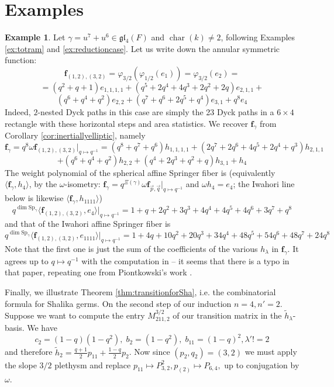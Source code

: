 \documentclass{amsart}
\numberwithin{equation}{section}
\theoremstyle{definition}
\newtheorem{example}[lemma]{Example}%
\def\tilde{\widetilde}
\def\Sp{{\mathrm{Sp}}}
\renewcommand{\th}{\tilde{h}}
\newcommand{\frs}{\mathbf{f}_{\vec{p},\vec{q}}}
\newcommand{\fpq}{\frs}
\newcommand{\fgamma}{\mathbf{f}_{\gamma}}
\newcommand{\fl}{\mathfrak{l}}
\newcommand{\fg}{\mathfrak{g}}
\DeclareMathOperator{\cchar}{\text{char}}
\begin{document}
\section{Examples}
\label{sec:examples}
\begin{example}
\label{ex:twothirteen2}
Let $\gamma=u^{7}+u^6\in \fg\fl_4(F)$ and $\cchar(k)\neq 2$, following Examples \ref{ex:totram} and \ref{ex:reductioncase}. 
Let us write down the annular symmetric function:
$$\mathbf{f}_{(1,2),(3,2)}=\varphi_{3/2}(\varphi_{1/2}(e_1))=\varphi_{3/2}(e_2)=$$
$$=\left(q^{2} + q + 1\right)e_{1,1,1,1} + \left(q^{5} + 2 q^{4} + 4 q^{3} + 2 q^{2} + 2 q\right)e_{2,1,1} + $$ $$\left(q^{6} + q^{4} + q^{2}\right)e_{2,2} + \left(q^{7} + q^{6} + 2 q^{5} + q^{4}\right)e_{3,1} + q^{8}e_{4}$$ Indeed, $2$-nested Dyck paths in this case are simply the 23 Dyck paths in a $6\times 4$ rectangle with these horizontal steps and area statistics. 
We recover $\fgamma$ from Corollary \ref{cor:inertiallyelliptic}, namely 
$$\fgamma=q^8\omega \mathbf{f}_{(1,2),(3,2)}|_{q\mapsto q^{-1}}=\left(q^{8} + q^{7} + q^{6}\right)h_{1,1,1,1} + \left(2 q^{7} + 2 q^{6} + 4 q^{5} + 2 q^{4} + q^{3}\right)h_{2,1,1} $$$$ + \left(q^{6} + q^{4} + q^{2}\right)h_{2,2} + \left(q^{4} + 2 q^{3} + q^{2} + q\right)h_{3,1} + h_{4}$$
The weight polynomial of the spherical affine Springer fiber is (equivalently $\langle\fgamma,h_4\rangle$, by the $\omega$-isometry: $\fgamma=q^{\Xi(\gamma)}\omega\fpq|_{q\mapsto q^{-1}}$ and $\omega h_4=e_4$; the Iwahori line below is likewise $\langle\fgamma,h_{1111}\rangle$)
$$q^{\dim \Sp_\gamma}\langle \mathbf{f}_{(1,2),(3,2)},e_4\rangle|_{q\mapsto q^{-1}}=
1+q+2q^2+3q^3+4q^4+4q^5+4q^6+3q^7+q^8
$$
and that of the Iwahori affine Springer fiber is 
$$q^{\dim \Sp_\gamma}\langle \mathbf{f}_{(1,2),(3,2)},e_{1111}\rangle|_{q\mapsto q^{-1}}=
1+4q+10q^2+20q^3+34q^4+48q^5+54q^6+48q^7+24q^8
$$ 
Note that the first one is just the sum of the coefficients of the various $h_\lambda$ in $\fgamma$. It agrees up to $q\mapsto q^{-1}$ with the computation in \cite[Eq. (3.1)]{CD} -- it seems that there is a typo in that paper, repeating one from Piontkowski's work \cite{Piontkowski}.


Finally, we illustrate Theorem \ref{thm:transitionforSha}, i.e. the combinatorial formula for Shalika germs. On the second step of our induction $n=4, n'=2$. Suppose we want to compute the entry 
$M^{3/2}_{211,2}$ of our transition matrix in the $\th_{\lambda}$-basis. 
We have
$$c_{2}=(1-q)(1-q^2), \; b_{2}=(1-q^2),\; b_{11}=(1-q)^2, \lambda'!=2$$
and therefore
$\th_{2}=\frac{q+1}{2}p_{11}+\frac{1-q}{2}p_{2}$. Now since $(p_2,q_2)=(3,2)$ we must apply the slope $3/2$ plethysm and replace $p_{11}\mapsto P_{3,2}^2, p_{(2)}\mapsto P_{6,4},$ up to conjugation by $\omega$.


\end{example}
\end{document}
